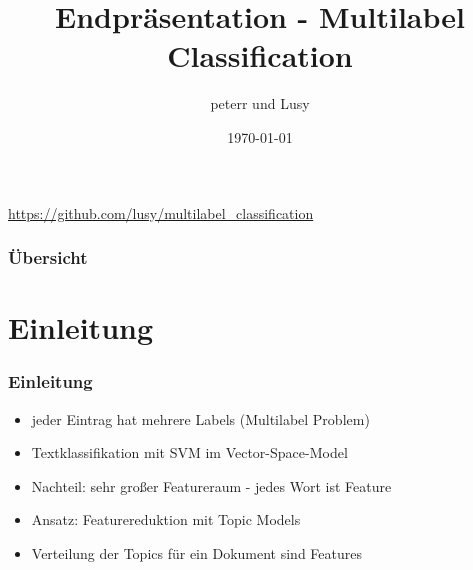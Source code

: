 \documentclass[12pt, xcolor=table]{beamer}
\begin{document}
\title{Endpräsentation - Multilabel Classification}
\author{peterr und Lusy}
\date{\today}

\begin{frame}
    \titlepage
    \begin{block}
        \tiny \url{https://github.com/lusy/multilabel\_classification}
    \end{block}
\end{frame}

\begin{frame}
    \frametitle{Übersicht}
    \tableofcontents
\end{frame}

\section{Einleitung} %
\begin{frame}
     \frametitle{Einleitung}
     \begin{itemize}
         \item jeder Eintrag hat mehrere Labels (Multilabel Problem)
         \item Textklassifikation mit SVM im Vector-Space-Model
         \item Nachteil: sehr großer Featureraum - jedes Wort ist Feature
         \item Ansatz: Featurereduktion mit Topic Models
         \item Verteilung der Topics für ein Dokument sind Features
     \end{itemize}
\end{frame}
\end{document}
